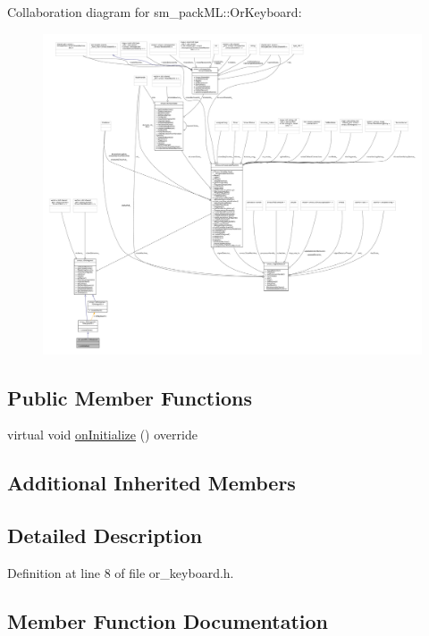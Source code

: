 Collaboration diagram for sm\+\_\+pack\+ML\+:\+:Or\+Keyboard\+:
\nopagebreak
\begin{figure}[H]
\begin{center}
\leavevmode
\includegraphics[width=350pt]{classsm__packML_1_1OrKeyboard__coll__graph}
\end{center}
\end{figure}
\subsection*{Public Member Functions}
\begin{DoxyCompactItemize}
\item 
virtual void \hyperlink{classsm__packML_1_1OrKeyboard_a4bdd03a6423e97af795d191d636082b6}{on\+Initialize} () override
\end{DoxyCompactItemize}
\subsection*{Additional Inherited Members}


\subsection{Detailed Description}


Definition at line 8 of file or\+\_\+keyboard.\+h.



\subsection{Member Function Documentation}
